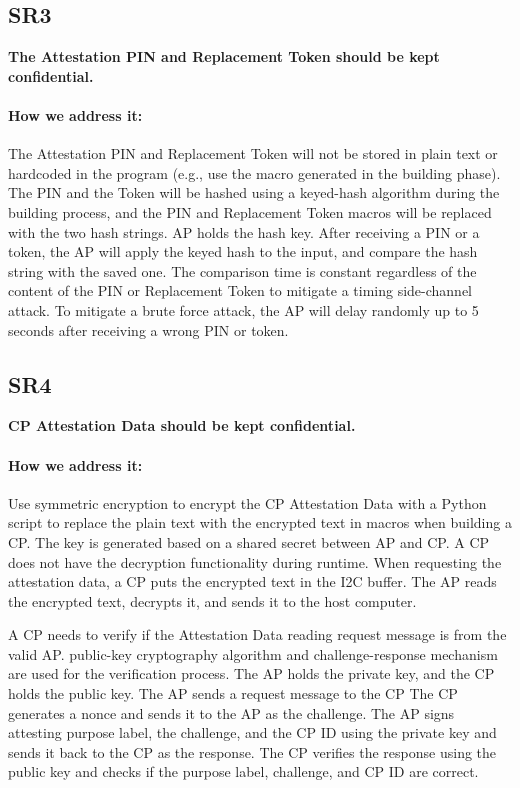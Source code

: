 \documentclass[11pt,oneside,onecolumn,letterpaper]{article}
\newcounter{alg}
\begin{document}
	\subsection{SR3}
	\textbf{The Attestation PIN and Replacement Token should be kept confidential.}
	\paragraph{How we address it:}
	The Attestation PIN and Replacement Token will not be stored in plain text or hardcoded in the program (e.g., use the macro generated in the building phase).
	The PIN and the Token will be hashed using a keyed-hash algorithm during the building process,
	and the PIN and Replacement Token macros will be replaced with the two hash strings.
	AP holds the hash key.
	After receiving a PIN or a token,
	the AP will apply the keyed hash to the input,
	and compare the hash string with the saved one.
	The comparison time is constant regardless of the content of the PIN or Replacement Token to mitigate a timing side-channel attack.
	To mitigate a brute force attack,
	the AP will delay randomly up to 5 seconds after receiving a wrong PIN or token.
	
	\subsection{SR4}
	\textbf{CP Attestation Data should be kept confidential.}
	\paragraph{How we address it:}
	Use symmetric encryption to encrypt the CP Attestation Data with a Python script to replace the plain text with the encrypted text in macros when building a CP.
	The key is generated based on a shared secret between AP and CP.
	A CP does not have the decryption functionality during runtime.
	When requesting the attestation data,
	a CP puts the encrypted text in the I2C buffer.
	The AP reads the encrypted text,
	decrypts it,
	and sends it to the host computer.
	
	A CP needs to verify if the Attestation Data reading request message is from the valid AP.
	public-key cryptography algorithm and challenge-response mechanism are used for the verification process.
	The AP holds the private key,
	and the CP holds the public key.
	The AP sends a request message to the CP
	The CP generates a nonce and sends it to the AP as the challenge.
	The AP signs attesting purpose label,
	the challenge,
	and the CP ID using the private key and sends it back to the CP as the response.
	The CP verifies the response using the public key and checks if the purpose label,
	challenge,
	and CP ID are correct.
	
\end{document}
